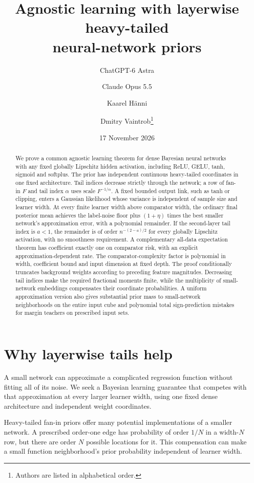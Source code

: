 \documentclass[11pt]{article}
\title{Agnostic learning with layerwise heavy-tailed\\neural-network priors}
\author{ChatGPT-6 Astra \and Claude Opus 5.5 \and Kaarel H\"anni \and
Dmitry Vaintrob\thanks{Authors are listed in alphabetical order.}}
\date{17 November 2026}
\theoremstyle{remark}\newtheorem{remark}[theorem]{Remark}
\begin{document}
\maketitle
\begin{abstract}
We prove a common agnostic learning theorem for dense Bayesian neural networks with any fixed globally Lipschitz hidden activation, including ReLU, GELU, tanh, sigmoid and softplus. The prior has independent continuous heavy-tailed coordinates in one fixed architecture. Tail indices decrease strictly through the network; a row of fan-in $F$ and tail index $\alpha$ uses scale $F^{-1/\alpha}$. A fixed bounded output link, such as tanh or clipping, enters a Gaussian likelihood whose variance is independent of sample size and learner width. At every finite learner width above comparator width, the ordinary final posterior mean achieves the label-noise floor plus $(1+\eta)$ times the best smaller network's approximation error, with a polynomial remainder. If the second-layer tail index is $a<1$, the remainder is of order $n^{-(2-a)/2}$ for every globally Lipschitz activation, with no smoothness requirement. A complementary all-data expectation theorem has coefficient exactly one on comparator risk, with an explicit approximation-dependent rate. The comparator-complexity factor is polynomial in width, coefficient bound and input dimension at fixed depth. The proof conditionally truncates background weights according to preceding feature magnitudes. Decreasing tail indices make the required fractional moments finite, while the multiplicity of small-network embeddings compensates their coordinate probabilities. A uniform approximation version also gives substantial prior mass to small-network neighborhoods on the entire input cube and polynomial total sign-prediction mistakes for margin teachers on prescribed input sets.
\end{abstract}

\section{Why layerwise tails help}
A small network can approximate a complicated regression function without fitting all of its noise. We seek a Bayesian learning guarantee that competes with that approximation at every larger learner width, using one fixed dense architecture and independent weight coordinates.

Heavy-tailed fan-in priors offer many potential implementations of a smaller network. A prescribed order-one edge has probability of order $1/N$ in a width-$N$ row, but there are order $N$ possible locations for it. This compensation can make a small function neighborhood's prior probability independent of learner width.
\end{document}
